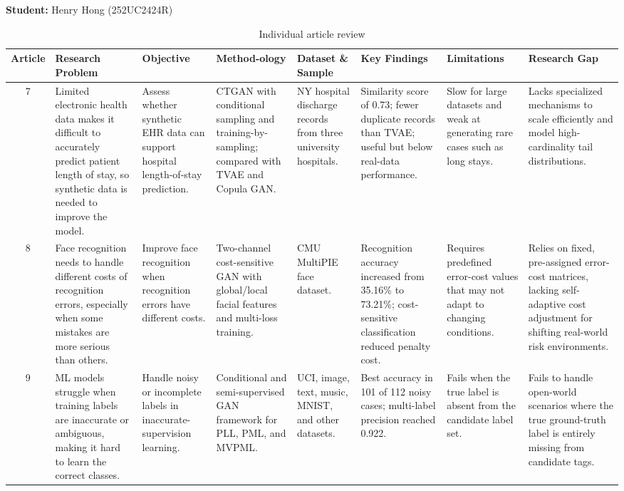 \documentclass[12pt,a4paper]{article}
\begin{document}
\newpage
\noindent \textbf{Student:} Henry Hong (252UC2424R)


\begin{table}[H]

\caption{Individual article review}
\label{tab:individual-article-review}

\fontsize{10pt}{12pt}\selectfont

\begin{tabular}{|c|p{1.7cm}|p{2cm}|p{1.8cm}|p{1.5cm}|p{1.5cm}|p{2cm}|p{2cm}|}
\hline

\centering\textbf{Article} &
\centering\textbf{Research Problem} &
\centering\textbf{Objective} &
\centering\textbf{Method-ology} &
\centering\textbf{Dataset \& Sample} &
\centering\textbf{Key Findings} &
\centering\textbf{Limitations} &
\centering\textbf{Research Gap}
\tabularnewline
\hline

7 &  
Limited electronic health data makes it difficult to accurately predict patient length of stay, so synthetic data is needed to improve the model. &
Assess whether synthetic EHR data can support hospital length-of-stay prediction. &
CTGAN with conditional sampling and training-by-sampling; compared with TVAE and Copula GAN. &
NY hospital discharge records from three university hospitals. &
Similarity score of 0.73; fewer duplicate records than TVAE; useful but below real-data performance. &
Slow for large datasets and weak at generating rare cases such as long stays.& Lacks specialized mechanisms to scale efficiently and model high-cardinality tail distributions.
\tabularnewline
\hline

8 &
Face recognition needs to handle different costs of recognition errors, especially when some mistakes are more serious than others. &  
Improve face recognition when recognition errors have different costs. &
Two-channel cost-sensitive GAN with global/local facial features and multi-loss training. &
CMU MultiPIE face dataset. &
Recognition accuracy increased from 35.16\% to 73.21\%; cost-sensitive classification reduced penalty cost. &
Requires predefined error-cost values that may not adapt to changing conditions.& Relies on fixed, pre-assigned error-cost matrices, lacking self-adaptive cost adjustment for shifting real-world risk environments.
\tabularnewline
\hline

9 &
ML models struggle when training labels are inaccurate or ambiguous, making it hard to learn the correct classes. &
Handle noisy or incomplete labels in inaccurate-supervision learning. &
Conditional and semi-supervised GAN framework for PLL, PML, and MVPML. &
UCI, image, text, music, MNIST, and other datasets. &
Best accuracy in 101 of 112 noisy cases; multi-label precision reached 0.922. & 
Fails when the true label is absent from the candidate label set.& Fails to handle open-world scenarios where the true ground-truth label is entirely missing from candidate tags.
\tabularnewline
\hline

\end{tabular}

\end{table}
\end{document}
